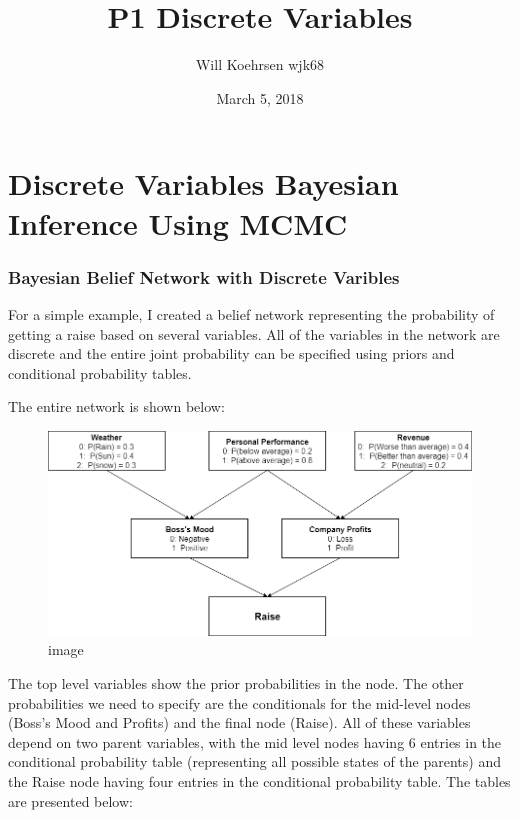 \documentclass[12pt]{article}
\title{P1 Discrete Variables}
\author{Will Koehrsen wjk68}
\date{March 5, 2018}
\makeatletter
\def\maxwidth{\ifdim\Gin@nat@width>\linewidth\linewidth
    \else\Gin@nat@width\fi}
\let\Oldincludegraphics\includegraphics
\renewcommand{\includegraphics}[1]{\Oldincludegraphics[width=.8\maxwidth]{#1}}
\makeatother
\begin{document}
    
    
    \maketitle
    \tableofcontents
    
    

    
    \hypertarget{discrete-variables-bayesian-inference-using-mcmc}{%
\section{Discrete Variables Bayesian Inference Using
MCMC}\label{discrete-variables-bayesian-inference-using-mcmc}}

    \hypertarget{bayesian-belief-network-with-discrete-varibles}{%
\subsubsection{Bayesian Belief Network with Discrete
Varibles}\label{bayesian-belief-network-with-discrete-varibles}}

For a simple example, I created a belief network representing the
probability of getting a raise based on several variables. All of the
variables in the network are discrete and the entire joint probability
can be specified using priors and conditional probability tables.

The entire network is shown below:

\begin{figure}
\centering
\includegraphics{images/Raise Network.png}
\caption{image}
\end{figure}

The top level variables show the prior probabilities in the node. The
other probabilities we need to specify are the conditionals for the
mid-level nodes (Boss's Mood and Profits) and the final node (Raise).
All of these variables depend on two parent variables, with the mid
level nodes having 6 entries in the conditional probability table
(representing all possible states of the parents) and the Raise node
having four entries in the conditional probability table. The tables are
presented below:
\end{document}

